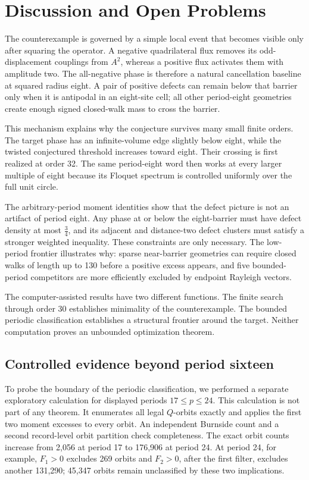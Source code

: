 \section{Discussion and Open Problems}\label{sec:discussion}

The counterexample is governed by a simple local event that becomes visible
only after squaring the operator. A negative quadrilateral flux removes its
odd-displacement couplings from \(A^{2}\), whereas a positive flux activates them
with amplitude two. The all-negative phase is therefore a natural
cancellation baseline at squared radius eight. A pair of positive defects can
remain below that barrier only when it is antipodal in an eight-site cell; all
other period-eight geometries create enough signed closed-walk mass to cross
the barrier.

This mechanism explains why the conjecture survives many small finite orders.
The target phase has an infinite-volume edge slightly below eight, while the
twisted conjectured threshold increases toward eight. Their crossing is first
realized at order 32. The same period-eight word then works at every larger
multiple of eight because its Floquet spectrum is controlled uniformly over
the full unit circle.

The arbitrary-period moment identities show that the defect picture is not an
artifact of period eight. Any phase at or below the eight-barrier must have
defect density at most \(\frac{3}{4}\), and its adjacent and distance-two defect clusters
must satisfy a stronger weighted inequality. These constraints are only
necessary. The low-period frontier illustrates why: sparse near-barrier
geometries can require closed walks of length up to 130 before a positive
excess appears, and five bounded-period competitors are more efficiently
excluded by endpoint Rayleigh vectors.

The computer-assisted results have two different functions. The finite search
through order 30 establishes minimality of the counterexample. The bounded
periodic classification establishes a structural frontier around the target.
Neither computation proves an unbounded optimization theorem.

\subsection{Controlled evidence beyond period sixteen}

To probe the boundary of the periodic classification, we performed a separate
exploratory calculation for displayed periods \(17\leq p\leq24\). This
calculation is not part of any theorem. It enumerates all legal \(Q\)-orbits
exactly and applies the first two moment excesses to every orbit. An independent
Burnside count and a second record-level orbit partition check completeness.
The exact orbit counts increase from 2,056 at period 17 to 176,906 at period 24. At
period 24, for example, \(F_1>0\) excludes 269 orbits and \(F_2>0\), after the
first filter, excludes another 131,290; 45,347 orbits remain unclassified by
these two implications.

